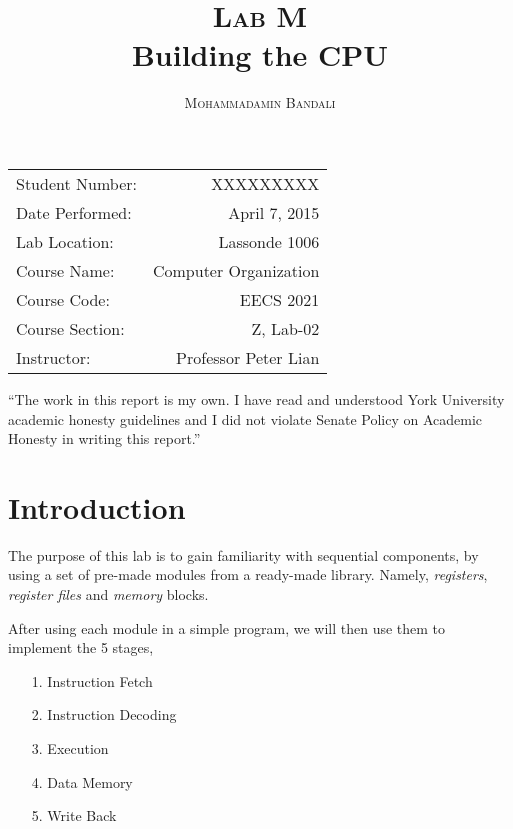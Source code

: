 \documentclass{article}
\title{\textsc{Lab M} \\ Building the CPU } %
\author{\textsc{Mohammadamin Bandali}} %
\date{} %
\newenvironment{statement}{\par\vspace{50ex}}{\clearpage}
\begin{document}
\maketitle %

\begin{center}
\begin{tabular}{l r}
Student Number: & XXXXXXXXX \\ 
Date Performed: & April 7, 2015 \\ %
Lab Location: & Lassonde 1006 \\ 
Course Name: & Computer Organization \\ 
Course Code: & EECS 2021 \\ 
Course Section: & Z, Lab-02\\ 
Instructor: & Professor Peter Lian %
\end{tabular}
\end{center}

\begin{statement}
“The work in this report is my own. I have read and understood York University
academic honesty guidelines and I did not violate Senate Policy on Academic
Honesty in writing this report.”
\end{statement}


\section{Introduction}

The purpose of this lab is to gain familiarity with sequential components, by
using a set of pre-made modules from a ready-made library. Namely,
\textit{registers}, \textit{register files} and \textit{memory} blocks. \newline

After using each module in a simple program, we will then use them to implement
the 5 stages,

\begin{enumerate}
\item[1. ] Instruction Fetch
\item[2. ] Instruction Decoding
\item[3. ] Execution
\item[4. ] Data Memory
\item[5. ] Write Back
\end{enumerate}
\end{document}
